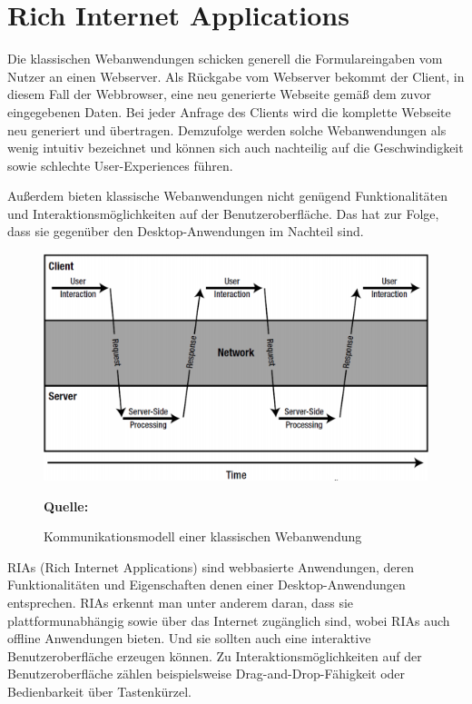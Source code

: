 \newpage
\section{Rich Internet Applications}
\label{sec:rich internet applications}
Die klassischen Webanwendungen schicken generell die Formulareingaben vom Nutzer an einen Webserver. Als Rückgabe vom Webserver bekommt der Client, in diesem Fall der Webbrowser, eine neu generierte Webseite gemäß dem zuvor eingegebenen Daten. Bei jeder Anfrage des Clients wird die komplette Webseite neu generiert und übertragen. Demzufolge werden solche Webanwendungen als wenig intuitiv bezeichnet und können sich auch nachteilig auf die Geschwindigkeit sowie schlechte User-Experiences führen.\bigskip

Außerdem bieten klassische Webanwendungen nicht genügend Funktionalitäten und Interaktionsmöglichkeiten auf der Benutzeroberfläche. Das hat zur Folge, dass sie gegenüber den Desktop-Anwendungen im Nachteil sind.

\begin{figure}[H]
  \begin{center}
    \includegraphics[scale=0.6]{img/clientServerKommunikation}
	\caption{Kommunikationsmodell einer klassischen Webanwendung}
	\footnotesize\sffamily\textbf{Quelle:} \cite{Ban2008a}  
	\label{fig:lientServerKommunikation}
  \end{center}   
\end{figure}

RIAs (Rich Internet Applications) sind webbasierte Anwendungen, deren Funktionalitäten und Eigenschaften denen einer Desktop-Anwendungen entsprechen. RIAs erkennt man unter anderem daran, dass sie plattformunabhängig sowie über das Internet zugänglich sind, wobei RIAs auch offline Anwendungen bieten. Und sie sollten auch eine interaktive Benutzeroberfläche erzeugen können. Zu Interaktionsmöglichkeiten auf der Benutzeroberfläche zählen beispielsweise Drag-and-Drop-Fähigkeit oder Bedienbarkeit über Tastenkürzel.\bigskip

